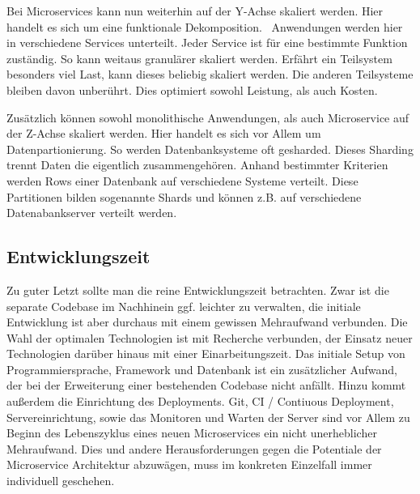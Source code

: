 Bei Microservices kann nun weiterhin auf der Y-Achse skaliert werden. Hier handelt es sich um eine funktionale Dekomposition.~\cite[][]{abbott2009art} Anwendungen werden hier in verschiedene Services unterteilt. Jeder Service ist für eine bestimmte Funktion zuständig. So kann weitaus granulärer skaliert werden. Erfährt ein Teilsystem besonders viel Last, kann dieses beliebig skaliert werden. Die anderen Teilsysteme bleiben davon unberührt. Dies optimiert sowohl Leistung, als auch Kosten.

Zusätzlich können sowohl monolithische Anwendungen, als auch Microservice auf der Z-Achse skaliert werden. Hier handelt es sich vor Allem um Datenpartionierung. So werden Datenbanksysteme oft gesharded.\cite[][]{microsoft:sharding} Dieses Sharding trennt Daten die eigentlich zusammengehören. Anhand bestimmter Kriterien werden Rows einer Datenbank auf verschiedene Systeme verteilt. Diese Partitionen bilden sogenannte Shards und können z.B. auf verschiedene Datenabankserver verteilt werden.

\subsection{Entwicklungszeit}
Zu guter Letzt sollte man die reine Entwicklungszeit betrachten. Zwar ist die separate Codebase im Nachhinein ggf. leichter zu verwalten, die initiale Entwicklung ist aber durchaus mit einem gewissen Mehraufwand verbunden. Die Wahl der optimalen Technologien ist mit Recherche verbunden, der Einsatz neuer Technologien darüber hinaus mit einer Einarbeitungszeit. Das initiale Setup von Programmiersprache, Framework und Datenbank ist ein zusätzlicher Aufwand, der bei der Erweiterung einer bestehenden Codebase nicht anfällt. Hinzu kommt außerdem die Einrichtung des Deployments. Git, CI / Contiuous Deployment, Servereinrichtung, sowie das Monitoren und Warten der Server sind vor Allem zu Beginn des Lebenszyklus eines neuen Microservices ein nicht unerheblicher Mehraufwand. Dies und andere Herausforderungen gegen die Potentiale der Microservice Architektur abzuwägen, muss im konkreten Einzelfall immer individuell geschehen.

